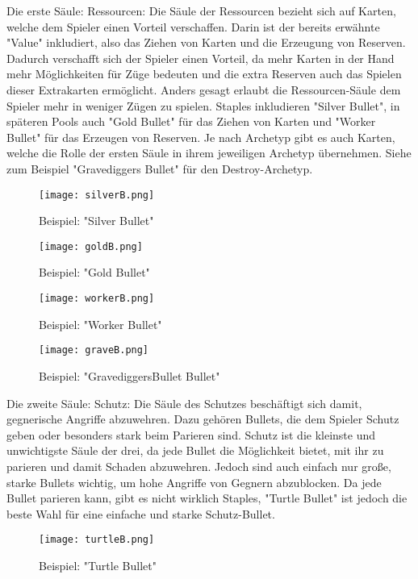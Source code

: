Die erste Säule: Ressourcen:
Die Säule der Ressourcen bezieht sich auf Karten, welche dem Spieler einen Vorteil verschaffen. Darin ist der bereits
erwähnte "Value" inkludiert, also das Ziehen von Karten und die Erzeugung von Reserven. Dadurch verschafft sich der Spieler einen Vorteil,
da mehr Karten in der Hand mehr Möglichkeiten für Züge bedeuten und die extra Reserven auch das Spielen dieser Extrakarten ermöglicht.
Anders gesagt erlaubt die Ressourcen-Säule dem Spieler mehr in weniger Zügen zu spielen.
Staples inkludieren "Silver Bullet", in späteren Pools auch "Gold Bullet" für das Ziehen von Karten und "Worker Bullet" für das Erzeugen von Reserven.
Je nach Archetyp gibt es auch Karten, welche die Rolle der ersten Säule in ihrem jeweiligen Archetyp übernehmen.
Siehe zum Beispiel "Gravediggers Bullet" für den Destroy-Archetyp.

\begin{figure}[H]
    \texttt{[image: silverB.png]}
    \caption{Beispiel: "Silver Bullet"}
\end{figure}

\begin{figure}[H]
    \texttt{[image: goldB.png]}
    \caption{Beispiel: "Gold Bullet"}
\end{figure}

\begin{figure}[H]
    \texttt{[image: workerB.png]}
    \caption{Beispiel: "Worker Bullet"}
\end{figure}

\begin{figure}[H]
    \texttt{[image: graveB.png]}
    \caption{Beispiel: "GravediggersBullet Bullet"}
\end{figure}


Die zweite Säule: Schutz:
Die Säule des Schutzes beschäftigt sich damit, gegnerische Angriffe abzuwehren. Dazu gehören Bullets, die dem Spieler
Schutz geben oder besonders stark beim Parieren sind. Schutz ist die kleinste und unwichtigste Säule der drei,
da jede Bullet die Möglichkeit bietet, mit ihr zu parieren und damit Schaden abzuwehren. Jedoch sind auch einfach nur große,
starke Bullets wichtig, um hohe Angriffe von Gegnern abzublocken. Da jede Bullet parieren kann, gibt es nicht wirklich Staples,
"Turtle Bullet" ist jedoch die beste Wahl für eine einfache und starke Schutz-Bullet.

\begin{figure}[H]
    \texttt{[image: turtleB.png]}
    \caption{Beispiel: "Turtle Bullet"}
\end{figure}

